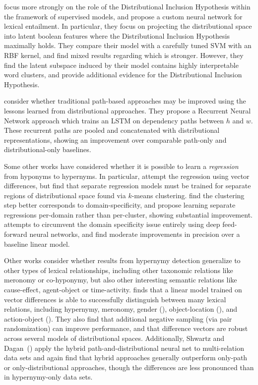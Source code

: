  focus more strongly on the role of the
Distributional Inclusion Hypothesis within the framework of supervised models,
and propose a custom neural network for lexical entailment. In particular, they
focus on projecting the distributional space into latent boolean features where
the Distributional Inclusion Hypothesis maximally holds. They compare their
model with a carefully tuned SVM with an RBF kernel, and find mixed results
regarding which is stronger. However, they find the latent subspace induced
by their model contains highly interpretable word clusters, and provide additional
evidence for the Distributional Inclusion Hypothesis.

 consider whether traditional path-based
approaches may be improved using the lessons learned from distributional
approaches. They propose a Recurrent Neural Network approach which trains
an LSTM \cite{hochreiter:1997:nc} on dependency paths between $h$ and $w$.
These recurrent paths are pooled and concatenated with distributional
representations, showing an improvement over comparable path-only and
distributional-only baselines.

Some other works have considered whether it is possible to learn a {\em
regression} from hyponyms to hypernyms. In particular, 
attempt the regression using vector differences, but find that separate
regression models must be trained for separate regions of distributional
space found via $k$-means clustering.  find
the clustering step better corresponds to domain-specificity, and propose
learning separate regressions per-domain rather than per-cluster, showing
substantial improvement.   attempts to
circumvent the domain specificity issue entirely using deep feed-forward neural
networks, and find moderate improvements in precision over a baseline linear
model.

Other works consider whether results from hypernymy detection generalize to
other types of lexical relationships, including other taxonomic relations
like meronomy or co-hyponymy, but also other interesting semantic relations
like cause-effect, agent-object or time-activity. 
finds that a linear model trained on vector differences is able to successfully
distinguish between many lexical relations, including hypernymy, meronomy,
gender (), object-location (), and
action-object (). They also find that additional negative
sampling (via pair randomization) can improve performance, and that difference
vectors are robust across several models of distributional spaces.
Additionally, Shwartz and Dagan~()
apply the hybrid path-and-distributional neural
net \cite{shwartz:2016:acl} to multi-relation data sets and again find that
hybrid approaches generally outperform only-path or only-distributional
approaches, though the differences are less pronounced than in hypernymy-only
data sets.

